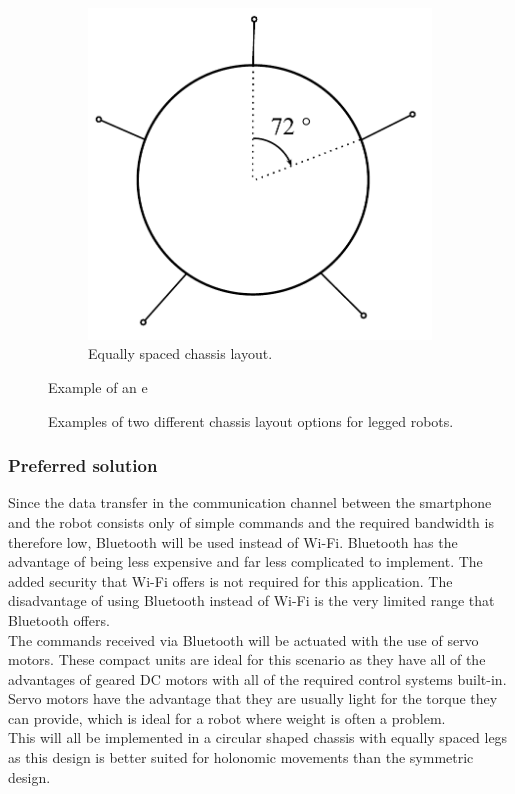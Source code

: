 \begin{figure}[t!]
\begin{subfigure}[t]{0.5\textwidth}
        \includegraphics[scale = 0.5]{pics/Body_Layout.pdf}
        \caption{Equally spaced chassis layout.}
    \end{subfigure}Example of an e
    \caption{Examples of two different chassis layout options for legged robots.}
    \label{fig:Body_layout}
\end{figure}

\subsubsection{Preferred solution}
Since the data transfer in the communication channel between the smartphone and the robot consists only of simple commands and the required bandwidth is therefore low, Bluetooth will be used instead of Wi-Fi. Bluetooth has the advantage of being less expensive and far less complicated to implement. The added security that Wi-Fi offers is not required for this application. The disadvantage of using Bluetooth instead of Wi-Fi is the very limited range that Bluetooth offers.\\

The commands received via Bluetooth will be actuated with the use of servo motors. These compact units are ideal for this scenario as they have all of the advantages of geared DC motors with all of the required control systems built-in. Servo motors have the advantage that they are usually light for the torque they can provide, which is ideal for a robot where weight is often a problem.\\

This will all be implemented in a circular shaped chassis with equally spaced legs as this design is better suited for holonomic movements than the symmetric design.

